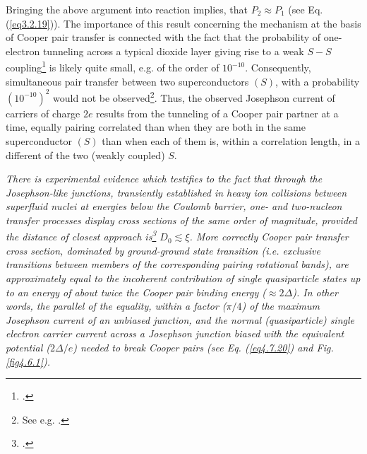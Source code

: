  
Bringing the above argument into reaction implies, that $P_2\approx P_1$ (see Eq. (\ref{eq3.2.19})).
 The importance of this result  concerning the mechanism at the basis of Cooper pair transfer is connected with the fact that the probability of one-electron tunneling across a typical dioxide layer giving rise to a weak $S-S$ coupling\footnote{\cite{Pippard:12}.} is likely quite small, e.g.  of the order of $10^{-10}$. Consequently, simultaneous pair transfer between two superconductors $(S)$, with a probability  $(10^{-10})^2$ would not be observed\footnote{See e.g. \cite{McDonald:01}.}. Thus, the observed Josephson current of carriers of charge $2e$ results from the tunneling of a Cooper pair partner at a time, equally pairing correlated than when they are both in the same superconductor $(S)$ than when each of them is, within a correlation length,  in a different of the two (weakly coupled) $S$. 

\textit{There is experimental evidence which testifies to the fact that through the Josephson-like junctions, transiently established in heavy ion collisions between superfluid nuclei at energies below the Coulomb barrier, one- and two-nucleon transfer processes display cross sections of the same order of magnitude, provided the distance of closest approach is\footnote{\cite{Potel:20b}.} $D_0\lesssim\xi$.  More correctly Cooper pair transfer cross section, dominated by ground-ground state transition (i.e. exclusive transitions between members of the corresponding pairing rotational bands), are approximately equal to the incoherent contribution of single quasiparticle states up to an energy of about twice the Cooper pair binding energy ($\approx2\Delta$). In other words, the parallel of the equality, within a factor ($\pi/4$) of the maximum Josephson current of an unbiased junction, and the normal (quasiparticle) single electron carrier current across a Josephson junction biased with the equivalent potential ($2\Delta/e$) needed to  break Cooper pairs (see Eq. (\ref{eq4.7.20}) and Fig. \ref{fig4.6.1}).} 
